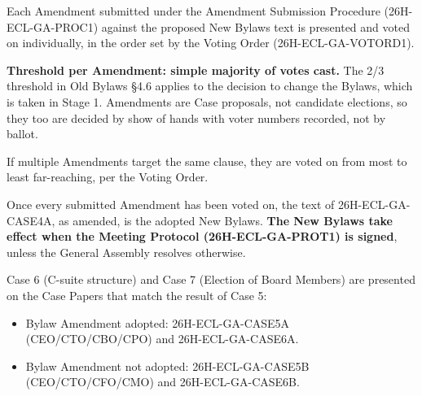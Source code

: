 \documentclass{../../../Common/Latex/Templates/rapport}
\begin{document}
Each Amendment submitted under the Amendment Submission Procedure (26H-ECL-GA-PROC1) against the proposed New Bylaws text is presented and voted on individually, in the order set by the Voting Order (26H-ECL-GA-VOTORD1).

\textbf{Threshold per Amendment: simple majority of votes cast.} The 2/3 threshold in Old Bylaws \S4.6 applies to the decision to change the Bylaws, which is taken in Stage 1. Amendments are Case proposals, not candidate elections, so they too are decided by show of hands with voter numbers recorded, not by ballot.

If multiple Amendments target the same clause, they are voted on from most to least far-reaching, per the Voting Order.

Once every submitted Amendment has been voted on, the text of 26H-ECL-GA-CASE4A, as amended, is the adopted New Bylaws. \textbf{The New Bylaws take effect when the Meeting Protocol (26H-ECL-GA-PROT1) is signed}, unless the General Assembly resolves otherwise.

Case 6 (C-suite structure) and Case 7 (Election of Board Members) are presented on the Case Papers that match the result of Case 5:
\begin{itemize}
  \item Bylaw Amendment adopted: 26H-ECL-GA-CASE5A (CEO/CTO/CBO/CPO) and 26H-ECL-GA-CASE6A.
  \item Bylaw Amendment not adopted: 26H-ECL-GA-CASE5B (CEO/CTO/CFO/CMO) and 26H-ECL-GA-CASE6B.
\end{itemize}
\end{document}
